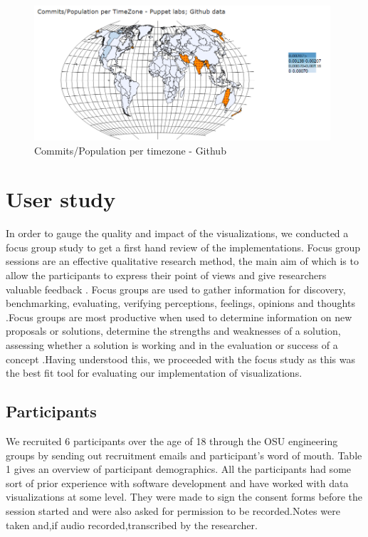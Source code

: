 \documentclass[seploa]{beavtex}
\begin{document}
\begin{figure}[H]
\centering
\includegraphics[width=110mm,height=50mm]{image10.PNG}
\caption{Commits/Population per timezone - Github}
\label{fig:div3}
\end{figure}

\chapter{User study}
In order to gauge the quality and impact of the visualizations, we conducted a focus group study to get a first hand review of the implementations. Focus group sessions are an effective qualitative research method, the main aim of which is to allow the participants to express their point of views and give researchers valuable feedback \cite{villard}.  Focus groups are used to gather information for discovery, benchmarking, evaluating, verifying perceptions, feelings, opinions and thoughts \cite{patton1990}.Focus groups are most productive when used to determine information on new proposals or solutions, determine the strengths and weaknesses of a solution, assessing whether a solution is working and in the evaluation or success of a concept \cite{greenbaum1993}.Having understood this, we proceeded with the focus study as this was the best fit tool for evaluating our implementation of visualizations.

\section{Participants}
We recruited 6 participants over the age of 18 through the OSU engineering groups by sending out recruitment emails and participant's word of mouth. Table 1 gives an overview of participant demographics. All the participants had some sort of prior experience with software development and have worked with data visualizations at some level. They were made to sign the consent forms before the session started and were also asked for permission to be recorded.Notes were taken and,if audio recorded,transcribed by the researcher.
\end{document}
